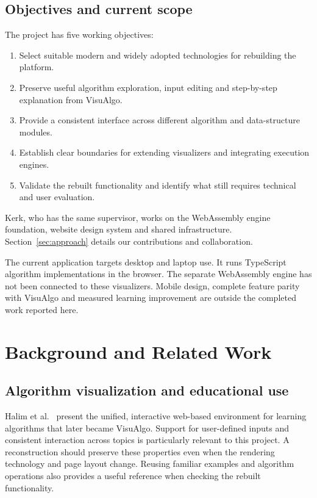 \documentclass[11pt,a4paper]{article}
\newcommand{\page}{\par\Needspace{5\baselineskip}\vspace{6pt}}
\begin{document}
\subsection{Objectives and current scope}
The project has five working objectives:
\begin{enumerate}
\item Select suitable modern and widely adopted technologies for rebuilding the platform.
\item Preserve useful algorithm exploration, input editing and step-by-step explanation from VisuAlgo.
\item Provide a consistent interface across different algorithm and data-structure modules.
\item Establish clear boundaries for extending visualizers and integrating execution engines.
\item Validate the rebuilt functionality and identify what still requires technical and user evaluation.
\end{enumerate}

Kerk, who has the same supervisor, works on the WebAssembly engine foundation, website design system and shared infrastructure. Section~\ref{sec:approach} details our contributions and collaboration.

The current application targets desktop and laptop use. It runs TypeScript algorithm implementations in the browser. The separate WebAssembly engine has not been connected to these visualizers. Mobile design, complete feature parity with VisuAlgo and measured learning improvement are outside the completed work reported here.

\endgroup
\page
\section{Background and Related Work}
\subsection{Algorithm visualization and educational use}
Halim et al.~\cite{halim2012} present the unified, interactive web-based environment for learning algorithms that later became VisuAlgo. Support for user-defined inputs and consistent interaction across topics is particularly relevant to this project. A reconstruction should preserve these properties even when the rendering technology and page layout change. Reusing familiar examples and algorithm operations also provides a useful reference when checking the rebuilt functionality.
\end{document}
